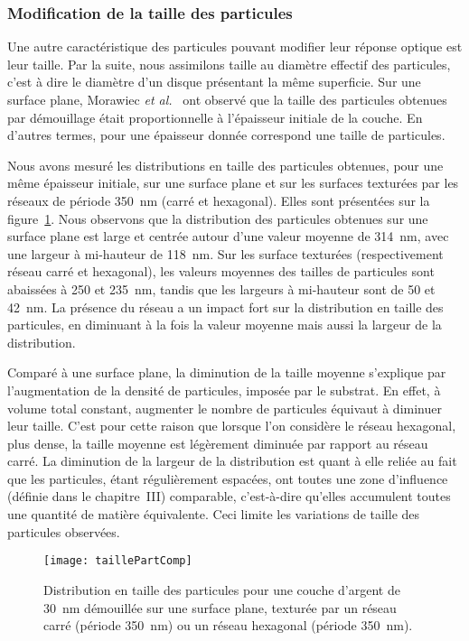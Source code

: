 \subsubsection{Modification de la taille des particules}
Une autre caractéristique des particules pouvant modifier leur réponse optique est leur taille. Par la suite, nous assimilons \og taille \fg{} au diamètre effectif des particules, c'est à dire le diamètre d'un disque présentant la même superficie. Sur une surface plane, Morawiec \textit{et al.}~\cite{morawiec2013self} ont observé que la taille des particules obtenues par démouillage était proportionnelle à l'épaisseur initiale de la couche. En d'autres termes, pour une épaisseur donnée correspond une taille de particules.\par 
Nous avons mesuré les distributions en taille des particules obtenues, pour une même épaisseur initiale, sur une surface plane et sur les surfaces texturées par les réseaux de période 350~nm (carré et hexagonal). Elles sont présentées sur la figure~\ref{taillePartComp}. Nous observons que la distribution des particules obtenues sur une surface plane est large et centrée autour d'une valeur moyenne de 314~nm, avec une largeur à mi-hauteur de 118~nm. Sur les surface texturées (respectivement réseau carré et hexagonal), les valeurs moyennes des tailles de particules sont abaissées à 250 et 235~nm, tandis que les largeurs à mi-hauteur sont de 50 et 42~nm. La présence du réseau a un impact fort sur la distribution en taille des particules, en diminuant à la fois la valeur moyenne mais aussi la largeur de la distribution.\par 
Comparé à une surface plane, la diminution de la taille moyenne s'explique par l'augmentation de la densité de particules, imposée par le substrat. En effet, à volume total constant, augmenter le nombre de particules équivaut à diminuer leur taille. C'est pour cette raison que lorsque l'on considère le réseau hexagonal, plus dense, la taille moyenne est légèrement diminuée par rapport au réseau carré. La diminution de la largeur de la distribution est quant à elle reliée au fait que les particules, étant régulièrement espacées, ont toutes une zone d'influence (définie dans le chapitre~III) comparable, c'est-à-dire qu'elles accumulent toutes une quantité de matière équivalente. Ceci limite les variations de taille des particules observées. \par 
\begin{figure}[!htb]
\centering
\texttt{[image: taillePartComp]}
\caption{Distribution en taille des particules pour une couche d'argent de 30~nm démouillée sur une surface plane, texturée par un réseau carré (période 350~nm) ou un réseau hexagonal (période 350~nm).}
\label{taillePartComp}
\end{figure}

